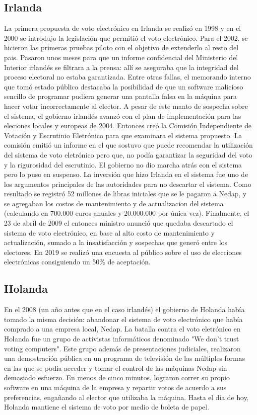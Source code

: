\subsection{Irlanda}
La primera propuesta de voto electrónico en Irlanda se realizó en 1998 y en el 2000 se introdujo la legislación que permitió el voto electrónico. Para el 2002, se hicieron las primeras pruebas piloto con el objetivo de extenderlo al resto del pais. Pasaron unos meses para que un informe confidencial del Ministerio del Interior irlandés se filtrara a la prensa: allí se aseguraba que la integridad del proceso electoral no estaba garantizada. Entre otras fallas, el memorando interno que tomó estado público destacaba la posibilidad de que un software malicioso sencillo de programar pudiera generar una pantalla falsa en la máquina para hacer votar incorrectamente al elector. A pesar de este manto de sospecha sobre el sistema, el gobierno irlandés avanzó con el plan de implementación para las eleciones locales y europeas de 2004. Entonces creó la Comisión Independiente de Votación y Escrutinio Eletrónico para que examinara el sistema propuesto. La comisión emitió un informe en el que sostuvo que puede recomendar la utilización del sistema de voto eletrónico pero que, no podía garantizar la seguridad del voto y la rigurosidad del escrutinio. El gobierno no dio marcha atrás con el sistema pero lo puso en suspenso. La inversión que hizo Irlanda en el sistema fue uno de los argumentos principales de las autoridades para no descartar el sistema. Como resultado se registró 52 millones de libras iniciales que se le pagaron a Nedap, y se agregaban los costos de mantenimiento y de actualizacion del sistema (calculando en 700.000 euros anuales y 20.000.000 por única vez).\newline
Finalmente, el 23 de abril de 2009 el entonces ministro anunció que quedaba descartado el sistema de voto electrónico, en base al alto costo de mantenimiento y actualización, sumado a la insatisfacción y sospechas que generó entre los electores. En 2019 se realizó una encuesta al público sobre el uso de elecciones electrónicas consiguiendo un 50\% de aceptación. \cite{eleccionesIrlanda}
\subsection{Holanda}
En el 2008 (un año antes que en el caso irlandés) el gobierno de Holanda había tomado la misma decisión: abandonar el sistema de voto electrónico que había comprado a una empresa local, Nedap. La batalla contra el voto eletrónico en Holanda fue un grupo de activistas informáticos denominado "We don't trust voting computers". Este grupo además de presentaciones judiciales, realizaron una demostración pública en un programa de televisión de las múltiples formas en las que se podía acceder y tomar el control de las máquinas Nedap sin demasiado esfuerzo. En menos de cinco minutos, lograron correr su propio software en una máquina de la empresa y repartir votos de acuerdo a sus preferencias, engañando al elector que utilizaba la máquina. Hasta el día de hoy, Holanda mantiene el sistema de voto por medio de boleta de papel.\cite{netherlands}

